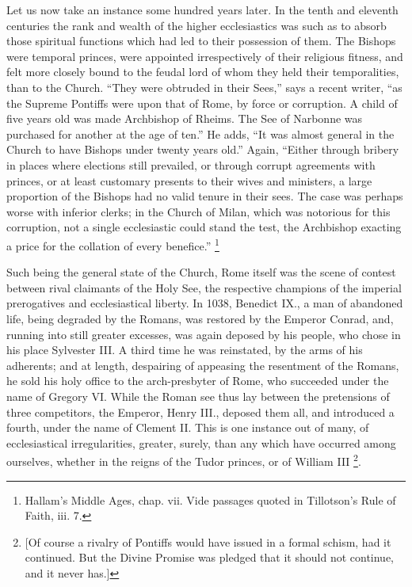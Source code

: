 Let us now take an instance some hundred years later. In the tenth
and eleventh centuries the rank and wealth of the higher ecclesiastics
was such as to absorb those spiritual functions which had led to their
possession of them. The Bishops were temporal princes, were appointed
irrespectively of their religious fitness, and felt more closely bound
to the feudal lord of whom they held their temporalities, than to the
Church. ``They were obtruded in their Sees,'' says a recent
writer, ``as the Supreme Pontiffs were upon that of Rome, by force
or corruption. A child of five years old was made Archbishop of Rheims.
The See of Narbonne was purchased for another at the age of ten.''
He adds, ``It was almost general in the Church to have Bishops
under twenty years old.'' Again, ``Either through bribery in
places where elections still prevailed, or through corrupt
agreements with princes, or at least customary presents to their wives
and ministers, a large proportion of the Bishops had no valid tenure
in their sees. The case was perhaps worse with inferior clerks; in the
Church of Milan, which was notorious for this corruption, not a single
ecclesiastic could stand the test, the Archbishop exacting a price for
the collation of every benefice.'' \footnote{Hallam's Middle Ages, chap. vii. Vide
passages quoted in Tillotson's Rule of Faith, iii. 7.}

Such being the general state of the Church, Rome itself was the
scene of contest between rival claimants of the Holy See, the
respective champions of the imperial prerogatives and ecclesiastical
liberty. In 1038, Benedict IX., a man of abandoned life, being
degraded by the Romans, was restored by the Emperor Conrad, and,
running into still greater excesses, was again deposed by his people,
who chose in his place Sylvester III. A third time he was reinstated,
by the arms of his adherents; and at length, despairing of appeasing
the resentment of the Romans, he sold his holy office to the
arch-presbyter of Rome, who succeeded under the name of Gregory VI.
While the Roman see thus lay between the pretensions of three
competitors, the Emperor, Henry III., deposed them all, and introduced
a fourth, under the name of Clement II. This is one instance out of
many, of ecclesiastical irregularities, greater, surely, than any
which have occurred among ourselves, whether in the reigns of the
Tudor princes, or of William III \footnote{[Of course a rivalry of Pontiffs would
have issued in a formal schism, had it continued. But the Divine
Promise was pledged that it should not continue, and it never has.]}.

